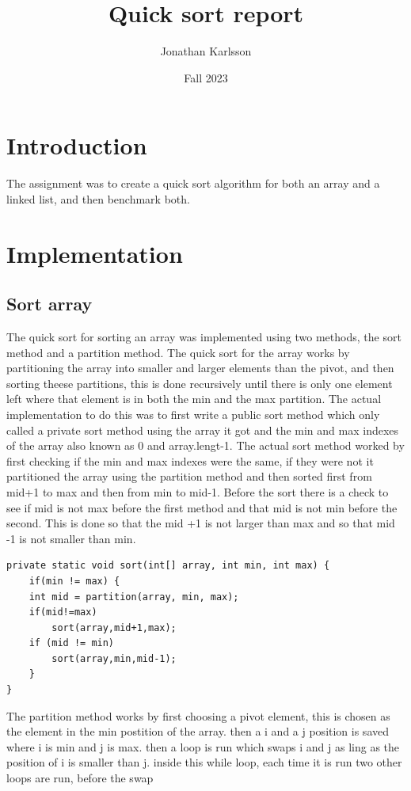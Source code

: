 \documentclass[a4paper,11pt]{article}
\begin{document}
\title{
    \textbf{Quick sort report}
}
\author{Jonathan Karlsson}
\date{Fall 2023}

\maketitle

\section*{Introduction}
The assignment was to create a quick sort algorithm for both an array and a linked list, and then benchmark both.
\section*{Implementation}
\subsection*{Sort array}
The quick sort for sorting an array was implemented using two methods, the sort method and a partition method. The quick sort for the array works by partitioning the array into smaller and larger elements than the pivot, and then 
sorting theese partitions, this is done recursively until there is only one element left where that element is in both the min and the max partition. 
The actual implementation to do this was to first write a public sort method which only called a private sort method using the array it got and the min and max indexes of the array also known as 0 and array.lengt-1. The actual sort method worked by first checking if the min and max indexes were the same, 
if they were not it partitioned the array using the partition method and then sorted first from mid+1 to max and then from min to mid-1. Before the sort there is a check to see if mid is not max before the first method and that mid is not min before the second. This is done so that the mid +1 is not larger than max and so that mid -1 is not smaller than min. 
\begin{verbatim}
private static void sort(int[] array, int min, int max) {
    if(min != max) {
    int mid = partition(array, min, max);
    if(mid!=max)
        sort(array,mid+1,max);
    if (mid != min)
        sort(array,min,mid-1);
    }
}
\end{verbatim}
The partition method works by first choosing a pivot element, this is chosen as the element in the min postition of the array. 
then a i and a j position is saved where i is min and j is max. then a loop is run which swaps i and j as ling as the position of i is smaller than j. inside this while loop, each time it is run two other loops are run, before the swap
\end{document}
